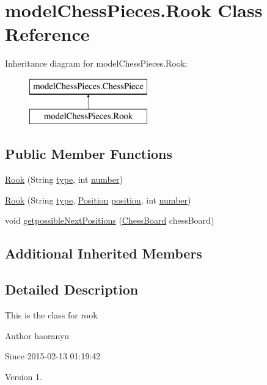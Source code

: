 \hypertarget{classmodel_chess_pieces_1_1_rook}{\section{model\+Chess\+Pieces.\+Rook Class Reference}
\label{classmodel_chess_pieces_1_1_rook}
}
Inheritance diagram for model\+Chess\+Pieces.\+Rook\+:\begin{figure}[H]
\begin{center}
\leavevmode
\includegraphics[height=2.000000cm]{classmodel_chess_pieces_1_1_rook}
\end{center}
\end{figure}
\subsection*{Public Member Functions}
\begin{DoxyCompactItemize}
\item 
\hyperlink{classmodel_chess_pieces_1_1_rook_a7cef743a515cb9ea132e09c99060cc96}{Rook} (String \hyperlink{classmodel_chess_pieces_1_1_chess_piece_a195487ca88c197af7c1604247be31db2}{type}, int \hyperlink{classmodel_chess_pieces_1_1_chess_piece_a979e63b99128333883acedc38d25dc87}{number})
\item 
\hyperlink{classmodel_chess_pieces_1_1_rook_af2c466d81052c7adcbb443d235aecdb6}{Rook} (String \hyperlink{classmodel_chess_pieces_1_1_chess_piece_a195487ca88c197af7c1604247be31db2}{type}, \hyperlink{classmodel_core_1_1_position}{Position} \hyperlink{classmodel_chess_pieces_1_1_chess_piece_a3d4362d5b28f6edb14161196d9c6807d}{position}, int \hyperlink{classmodel_chess_pieces_1_1_chess_piece_a979e63b99128333883acedc38d25dc87}{number})
\item 
void \hyperlink{classmodel_chess_pieces_1_1_rook_aa1dff23baf32a526be1e23cdcbe01123}{getpossible\+Next\+Positions} (\hyperlink{classmodel_core_1_1_chess_board}{Chess\+Board} chess\+Board)
\end{DoxyCompactItemize}
\subsection*{Additional Inherited Members}


\subsection{Detailed Description}
This is the class for rook \begin{DoxyAuthor}{Author}
haoranyu 
\end{DoxyAuthor}
\begin{DoxySince}{Since}
2015-\/02-\/13 01\+:19\+:42 
\end{DoxySince}
\begin{DoxyVersion}{Version}
1. 
\end{DoxyVersion}



